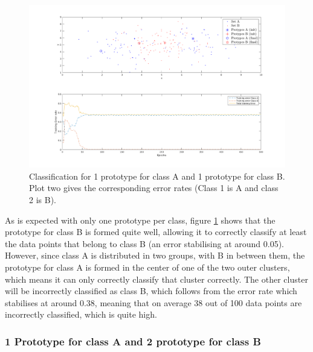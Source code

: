 \documentclass[10pt]{article}
\begin{document}
\begin{figure}[H]
 \centering
 \includegraphics[width=\textwidth]{Fig12_a1.png}
 \caption{Classification for 1 prototype for class A and 1 prototype for class B. Plot two gives the corresponding error rates (Class 1 is A and class 2 is B).}
 \label{fig1.12a}
\end{figure}
As is expected with only one prototype per class, figure \ref{fig1.12a} shows that the prototype for class B is formed quite well, allowing it to correctly classify at least the data points that belong to class B (an error stabilising at around 0.05). However, since class A is distributed in two groups, with B in between them, the prototype for class A is formed in the center of one of the two outer clusters, which means it can only correctly classify that cluster correctly. The other cluster will be incorrectly classified as class B, which follows from the error rate which stabilises at around 0.38, meaning that on average 38 out of 100 data points are incorrectly classified, which is quite high.

\subsubsection{1 Prototype for class A and 2 prototype for class B}
\end{document}

